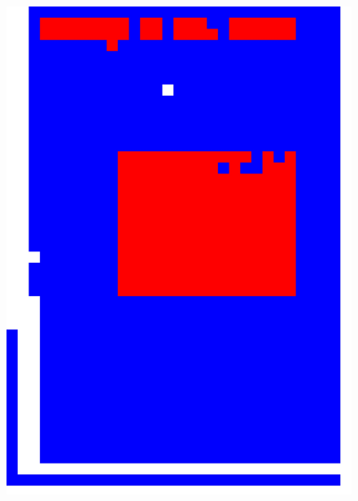 \documentclass{book}
\begin{document}
\begin{figure}[H]
\begin{center}
\includegraphics[scale=0.2]{images/1g_res_hog_hsv.jpg}

\end{center}
\end{figure}
\end{document}
